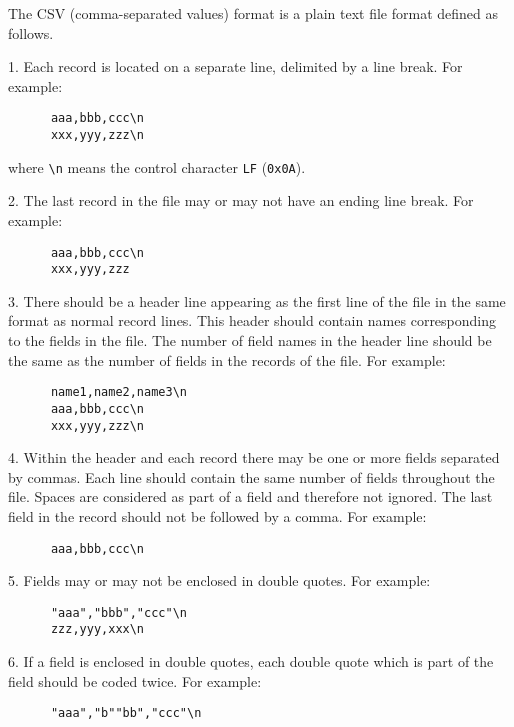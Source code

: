 \documentclass[11pt]{report}
\begin{document}
The CSV (comma-separated values) format is a plain text file format
defined as follows.

1. Each record is located on a separate line, delimited by a line
break. For example:

\begin{verbatim}
      aaa,bbb,ccc\n
      xxx,yyy,zzz\n
\end{verbatim}

\noindent
where \verb|\n| means the control character \verb|LF| ({\tt 0x0A}).

2. The last record in the file may or may not have an ending line
break. For example:

\begin{verbatim}
      aaa,bbb,ccc\n
      xxx,yyy,zzz
\end{verbatim}

3. There should be a header line appearing as the first line of the
file in the same format as normal record lines. This header should
contain names corresponding to the fields in the file. The number of
field names in the header line should be the same as the number of
fields in the records of the file. For example:

\begin{verbatim}
      name1,name2,name3\n
      aaa,bbb,ccc\n
      xxx,yyy,zzz\n
\end{verbatim}

4. Within the header and each record there may be one or more fields
separated by commas. Each line should contain the same number of fields
throughout the file. Spaces are considered as part of a field and
therefore not ignored. The last field in the record should not be
followed by a comma. For example:

\begin{verbatim}
      aaa,bbb,ccc\n
\end{verbatim}

5. Fields may or may not be enclosed in double quotes. For example:

\begin{verbatim}
      "aaa","bbb","ccc"\n
      zzz,yyy,xxx\n
\end{verbatim}

6. If a field is enclosed in double quotes, each double quote which is
part of the field should be coded twice. For example:

\begin{verbatim}
      "aaa","b""bb","ccc"\n
\end{verbatim}
\end{document}
